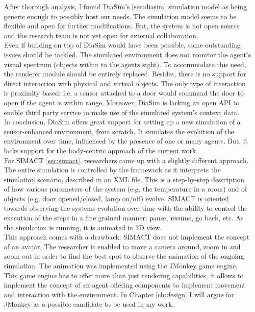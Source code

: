 After thorough analysis, I found DiaSim's \ref{sec:diasim} simulation model as being generic enough to possibly host our needs. The simulation model seems to be flexible and open for further modifications. But, the system is not open source and the research team is not yet open for external collaboration.\\

Even if building on top of DiaSim would have been possible, some outstanding issues should be tackled. The simulated environment does not monitor the agent's visual spectrum (objects within to the agents sight). To accommodate this need, the renderer module should be entirely replaced. Besides, there is no support for direct interaction with physical and virtual objects. The only type of interaction is proximity based: i.e. a sensor attached to a door would command the door to open if the agent is within range. Moreover, DiaSim is lacking an open API to enable third party service to make use of the simulated system's context data.\\

In conclusion, DiaSim offers great support for setting up a new simulation of a sensor-enhanced environment, from scratch. It simulates the evolution of the environment over time, influenced by the presence of one or many agents. But, it lacks support for the body-centric approach of the current work.\\

For SIMACT \ref{sec:simact}, researchers came up with a slightly different approach. The entire simulation is controlled by the framework as it interprets the simulation scenario, described in an XML file. This is a step-by-step description of how various parameters of the system (e.g. the temperature in a room) and of objects (e.g. door opened/closed, lamp on/off) evolve. SIMACT is oriented towards observing the systems evolution over time with the ability to control the execution of the steps in a fine grained manner: pause, resume, go back, etc. As the simulation is running, it is animated in 3D view.\\

This approach comes with a drawback: SIMACT does not implement the concept of an avatar. The researcher is enabled to move a camera around, zoom in and zoom out in order to find the best spot to observe the animation of the ongoing simulation. The animation was implemented using the JMonkey game engine. This game engine has to offer more than just rendering capabilities, it allows to implement the concept of an agent offering components to implement movement and interaction with the environment. In Chapter \ref{ch:design} I will argue for JMonkey as a possible candidate to be used in my work.\\

